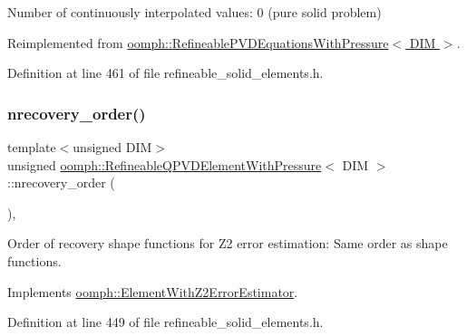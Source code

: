 Number of continuously interpolated values\+: 0 (pure solid problem) 



Reimplemented from \hyperlink{classoomph_1_1RefineablePVDEquationsWithPressure_a16bc4f58cc9a079c8db705306a23b41b}{oomph\+::\+Refineable\+P\+V\+D\+Equations\+With\+Pressure$<$ D\+I\+M $>$}.



Definition at line 461 of file refineable\+\_\+solid\+\_\+elements.\+h.

\mbox{\label{classoomph_1_1RefineableQPVDElementWithPressure_a84afe8c95d37e68a32d7379700f838af}} 
\subsubsection{\texorpdfstring{nrecovery\+\_\+order()}{nrecovery\_order()}}
{\footnotesize\ttfamily template$<$unsigned D\+IM$>$ \\
unsigned \hyperlink{classoomph_1_1RefineableQPVDElementWithPressure}{oomph\+::\+Refineable\+Q\+P\+V\+D\+Element\+With\+Pressure}$<$ D\+IM $>$\+::nrecovery\+\_\+order (\begin{DoxyParamCaption}{ }\end{DoxyParamCaption})\hspace{0.3cm}{\ttfamily [inline]}, {\ttfamily [virtual]}}



Order of recovery shape functions for Z2 error estimation\+: Same order as shape functions. 



Implements \hyperlink{classoomph_1_1ElementWithZ2ErrorEstimator_af39480835bd3e0f6b2f4f7a9a4044798}{oomph\+::\+Element\+With\+Z2\+Error\+Estimator}.



Definition at line 449 of file refineable\+\_\+solid\+\_\+elements.\+h.

\mbox{\label{classoomph_1_1RefineableQPVDElementWithPressure_a89f62fc2fdb02ee78f36eef6b7d2f434}} 
